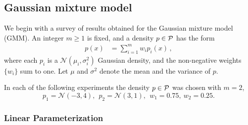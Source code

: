 \subsection{Gaussian mixture model}
\label{Results}

We begin with a survey of results obtained for the Gaussian mixture model (GMM).  An integer $m\ge 1$ is fixed, and a density $p\in {\cal P}$ has the form
\begin{equation*}
\begin{aligned}
p(x)& = \sum_{i=1}^{m} w_{i} p_{i}(x) \,,
\end{aligned}
\end{equation*}
where each $p_{i}$ is a $\mathcal{N}(\mu_i,\sigma_i^2)$ Gaussian density, and the non-negative weights $\{w_i\}$ sum to one. Let $\mu$ and $\sigma^{2}$ denote the mean and the variance of $p$.
%
%
%

In each of the following experiments the density $p\in{\cal P}$ was chosen with $m=2$,
\[
p_1 = \mathcal{N}(-3, 4),\ \
p_2 = \mathcal{N}(3, 1),\ \
w_1 =0.75,\
w_2 =0.25.
\]

\subsubsection*{Linear Parameterization}

